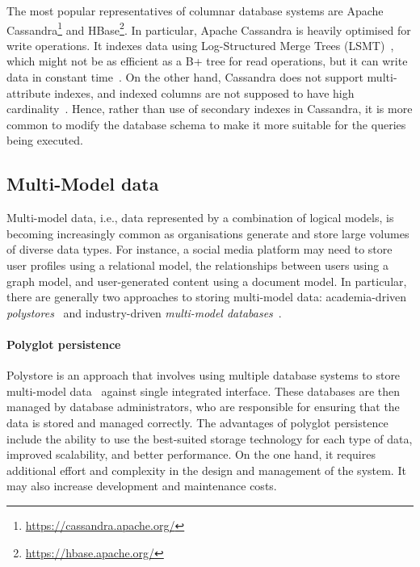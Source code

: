 The most popular representatives of columnar database systems are Apache Cassandra\footnote{\url{https://cassandra.apache.org/}} and HBase\footnote{\url{https://hbase.apache.org/}}. In particular, Apache Cassandra is heavily optimised for write operations. It indexes data using Log-Structured Merge Trees (LSMT)~\citep{cassandraLSMT}, which might not be as efficient as a B+ tree for read operations, but it can write data in constant time~\citep{LSMT}. On the other hand, Cassandra does not support multi-attribute indexes, and indexed columns are not supposed to have high cardinality~\citep{cassandraIndexOfficial,datastaxCQL}. Hence, rather than use of secondary indexes in Cassandra, it is more common to modify the database schema to make it more suitable for the queries being executed.

\subsection{Multi-Model data}
Multi-model data, i.e., data represented by a combination of logical models, is becoming increasingly common as organisations generate and store large volumes of diverse data types. For instance, a social media platform may need to store user profiles using a relational model, the relationships between users using a graph model, and user-generated content using a document model. In particular, there are generally two approaches to storing multi-model data: academia-driven \textit{polystores}~\citep{PolyglotPersistance} and industry-driven \textit{multi-model databases}~\citep{CSUR-Jiaheng}.

\paragraph{Polyglot persistence}
Polystore is an approach that involves using multiple database systems to store multi-model data~\citep{PolyglotPersistance} against single integrated interface. These databases are then managed by database administrators, who are responsible for ensuring that the data is stored and managed correctly. The advantages of polyglot persistence include the ability to use the best-suited storage technology for each type of data, improved scalability, and better performance. On the one hand, it requires additional effort and complexity in the design and management of the system. It may also increase development and maintenance costs.

